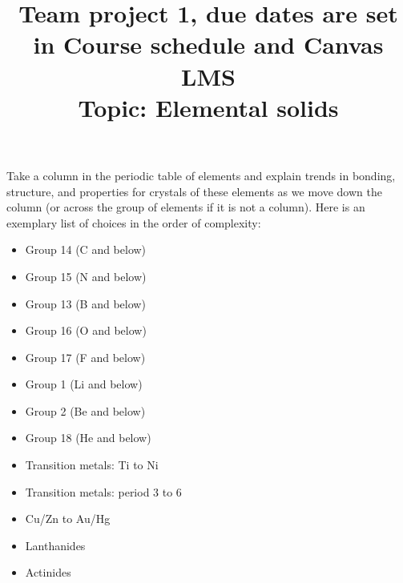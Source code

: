 \documentclass[11pt]{Project}
\begin{document}
\title{Team project 1, due dates are set in Course schedule and Canvas LMS \\ Topic: Elemental solids}
\maketitle

Take a column in the periodic table of elements and explain trends in bonding, structure, and properties for crystals of these elements as we move down the column (or across the group of elements if it is not a column). Here is an exemplary list of choices in the order of complexity:

\begin{itemize}
\item Group 14 (C and below)
\item Group 15 (N and below)
\item Group 13 (B and below)
\item Group 16 (O and below)
\item Group 17 (F and below)
\item Group 1 (Li and below)
\item Group 2 (Be and below)
\item Group 18 (He and below) 
\item Transition metals: Ti to Ni
\item Transition metals: period 3 to 6
\item Cu/Zn to Au/Hg
\item Lanthanides
\item Actinides
\end{itemize}

\reminder{}
\end{document}
